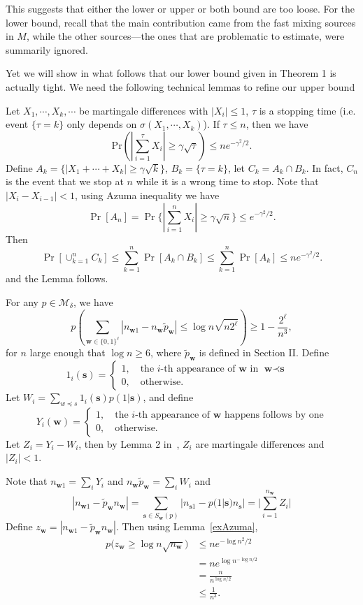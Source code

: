 \documentclass[conference,a4paper]{article}
\newcommand{\w}{\textbf{w}}
\newcommand{\s}{\textbf{s}}
\newcommand{\M}{\mathcal{M}}
\begin{document}
This suggests that either the lower or upper or both bound are too
loose. For the lower bound, recall that the main contribution came from
the fast mixing sources in $M$, while the other sources---the ones that
are problematic to estimate, were summarily ignored. 

Yet we will show in what follows that our lower bound given in Theorem
1 is actually tight. We need the following technical lemmas to refine 
our upper bound 


\label{exAzuma}
Let $X_1,\cdots,X_k,\cdots$ be martingale differences with $|X_i|\le 1$, $\tau$ is a stopping time (i.e. event $\{\tau=k\}$ only depends on $\sigma(X_1,\cdots,X_k)$). If $\tau\le n$, then we have
$$\mathrm{Pr}\left(\left|\sum_{i=1}^{\tau}X_i\right|\ge \gamma \sqrt{\tau}\right)\le ne^{-\gamma^2/2}.$$
\Proof
Define $A_k=\{|X_1+\cdots+X_k|\ge \gamma \sqrt{k}\}$, $B_k=\{\tau=k\}$, let $C_k=A_k\cap B_k$. In fact, $C_n$ is the event that we stop at $n$ while it is a wrong time to stop. Note that $|X_i-X_{i-1}|<1$, using Azuma inequality we have
\[
\Pr[A_n]=\Pr\{|\sum_{i=1}^n X_i|\geq \gamma \sqrt{n}\}\leq e^{-\gamma^2/2}.
\]
Then 
\[
\Pr[\cup_{k=1}^n C_k]\leq \sum_{k=1}^n\Pr[A_k\cap B_k]\leq \sum_{k=1}^n \Pr[A_k]\leq n e^{-\gamma^2/2}.
\]
and the Lemma follows. 
\eLemma

\bLemma
\label{lemBoundEps}
For any $p\in \M_{\delta}$, we have
$$p\left(\sum_{\w\in\{0,1\}^{\ell}}|n_{\w1}-n_{\w}\tilde{p}_{\w}|\le \log n\sqrt{n2^{\ell}}\right)\ge 1-\frac{2^{\ell}}{n^3},$$for $n$ large enough that $\log n\ge 6$, where $\tilde{p}_{\w}$ is defined in Section II.
\Proof
Define 
\[
1_i(\s)=
\left\{ 
\begin{array}{c}
1,\quad \text{the $i$-th appearance of $\w$ in $\w\prec\s$ } \\ 
0, \quad  \text{otherwise.}
\end{array}
\right. 
\]
Let $W_i=\sum_{w\preceq s}1_i(\s)p(1|\s)$, and define
\[
Y_i(\w)=
\left\{ 
\begin{array}{c}
1, \quad \text{the $i$-th appearance of $\w$ happens follows by one} \\ 
0, \quad  \text{otherwise.}
\end{array}
\right. 
\]
Let $Z_i=Y_i-W_i$, then by Lemma 2 in~\cite{oshiro2017jackknife}, $Z_i$ are martingale differences and $|Z_i|<1$. 

Note that $n_{\w1}=\sum_i Y_i$ and $n_{\w}\tilde{p}_{\w}=\sum_i W_i$ and
\[
|n_{\w 1}-\tilde{p}_\w n_\w|=\sum_{\s\in S_\w(p)}|n_{\s 1}-p(1|\s)n_\s|=|\sum_{i=1}^{n_\w}Z_i|
\]
Define $z_\w=|n_{\w 1}-\tilde{p}_\w n_\w|$. Then using Lemma~\ref{exAzuma},
\begin{align*}
p\bigg( z_\w \geq \log n\sqrt {n_\w}\bigg)
&\leq ne^{-\log n^2/2}\\
&=ne^{\log n^{-\log n/2}}\\
&=\frac{n}{n^{\log n/2}}\\
&\leq \frac1{n^3}.
\end{align*} 
\end{document}
